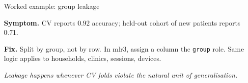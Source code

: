 \documentclass[10pt,compress,t,notes=noshow, xcolor=table]{beamer}
\begin{document}
\begin{frame}{Worked example: group leakage}
\begin{center}
\end{center}

\medskip

\textbf{Symptom.} CV reports 0.92 accuracy; held-out cohort of new patients reports 0.71.

\medskip

\textbf{Fix.} Split by group, not by row. In mlr3, assign a column the \texttt{group} role. Same logic applies to households, clinics, sessions, devices.

\medskip

\centering\footnotesize\itshape Leakage happens whenever CV folds violate the natural unit of generalisation.

\end{frame}
\end{document}
